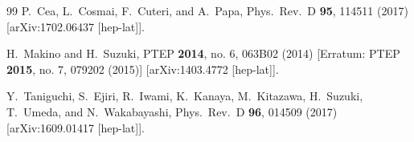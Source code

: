 \documentclass[3p,twocolumn,sort&compress]{elsarticle}
\begin{document}
\begin{thebibliography}{99}
  P.~Cea, L.~Cosmai, F.~Cuteri, and A.~Papa,
  Phys.\ Rev.\ D {\bf 95}, 114511 (2017)
  [arXiv:1702.06437 [hep-lat]].

  H.~Makino and H.~Suzuki,
 PTEP {\bf 2014}, no. 6, 063B02 (2014) [Erratum: PTEP {\bf 2015}, no. 7,
        079202 (2015)]
        [arXiv:1403.4772 [hep-lat]].

  Y.~Taniguchi, S.~Ejiri, R.~Iwami, K.~Kanaya, M.~Kitazawa, H.~Suzuki,
  T.~Umeda, and N.~Wakabayashi,
  Phys.\ Rev.\ D {\bf 96}, 014509 (2017)
  [arXiv:1609.01417 [hep-lat]].





\end{thebibliography}
\end{document}

